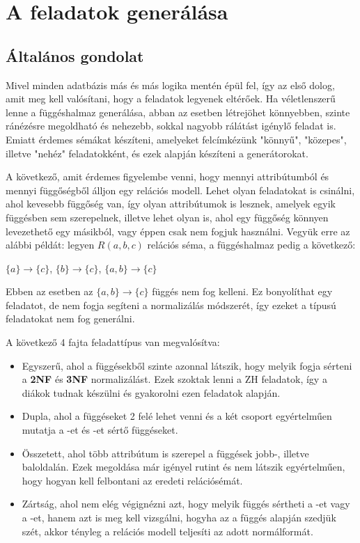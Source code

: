 \chapter{A feladatok generálása}

\section{Általános gondolat}
Mivel minden adatbázis más és más logika mentén épül fel, így az első dolog, amit meg kell valósítani, hogy a feladatok legyenek eltérőek. Ha véletlenszerű lenne a függéshalmaz generálása, abban az esetben létrejöhet könnyebben, szinte ránézésre megoldható és nehezebb, sokkal nagyobb rálátást igénylő feladat is. Emiatt érdemes sémákat készíteni, amelyeket felcímkézünk "könnyű", "közepes", illetve "nehéz" feladatokként, és ezek alapján készíteni a generátorokat. \par
A következő, amit érdemes figyelembe venni, hogy mennyi attribútumból és mennyi függőségből álljon egy relációs modell. Lehet olyan feladatokat is csinálni, ahol kevesebb függőség van, így olyan attribútumok is lesznek, amelyek egyik függésben sem szerepelnek, illetve lehet olyan is, ahol egy függőség könnyen levezethető egy másikból, vagy éppen csak nem fogjuk használni. Vegyük erre az alábbi példát: legyen $R(a,b,c)$ relációs séma, a függéshalmaz pedig a következő:
\begin{center}
    $\{a\} \longrightarrow \{c\}$, $\{b\} \longrightarrow \{c\}$, $\{a,b\} \longrightarrow \{c\}$
\end{center}
Ebben az esetben az $\{a,b\} \rightarrow \{c\}$ függés nem fog kelleni. Ez bonyolíthat egy feladatot, de nem fogja segíteni a normalizálás módszerét, így ezeket a típusú feladatokat nem fog generálni. \par
A következő 4 fajta feladattípus van megvalósítva:
\begin{itemize}
    \item Egyszerű, ahol a függésekből szinte azonnal látszik, hogy melyik fogja sérteni a \textbf{2NF} és \textbf{3NF} normalizálást. Ezek szoktak lenni a ZH feladatok, így a diákok tudnak készülni és gyakorolni ezen feladatok alapján.
    \item Dupla, ahol a függéseket 2 felé lehet venni és a két csoport egyértelműen mutatja a \nfk-et és \nfh-et sértő függéseket.
    \item Összetett, ahol több attribútum is szerepel a függések jobb-, illetve baloldalán. Ezek megoldása már igényel rutint és nem látszik egyértelműen, hogy hogyan kell felbontani az eredeti relációsémát.
    \item Zártság, ahol nem elég végignézni azt, hogy melyik függés sértheti a \nfk-et vagy a \nfh-et, hanem azt is meg kell vizsgálni, hogyha az a függés alapján szedjük szét, akkor tényleg a relációs modell teljesíti az adott normálformát.
\end{itemize}

